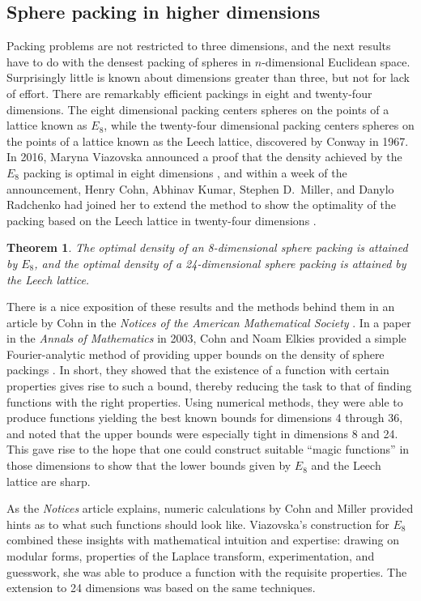 \documentclass{amsart}
\newtheorem{theorem}{Theorem}[section]
\theoremstyle{definition}
\theoremstyle{remark}
\numberwithin{equation}{section}
\begin{document}
\subsection{Sphere packing in higher dimensions}

Packing problems are not restricted to three dimensions, and the next results have to do with the densest packing of spheres in $n$-dimensional Euclidean space. Surprisingly little is known about dimensions greater than three, but not for lack of effort. There are remarkably efficient packings in eight and twenty-four dimensions. The eight dimensional packing centers spheres on the points of a lattice known as $E_8$, while the twenty-four dimensional packing centers spheres on the points of a lattice known as the Leech lattice, discovered by Conway in 1967. In 2016, Maryna Viazovska announced a proof that the density achieved by the $E_8$ packing is optimal in eight dimensions \cite{viazovska:17}, and within a week of the announcement, Henry Cohn, Abhinav Kumar, Stephen D.~Miller, and Danylo Radchenko had joined her to extend the method to show the optimality of the packing based on the Leech lattice in twenty-four dimensions \cite{cohn:et:al:17}.

\begin{theorem}
\label{theorem:leech}
The optimal density of an 8-dimensional sphere packing is attained by $E_8$, and the optimal density of a 24-dimensional sphere packing is attained by the Leech lattice.
\end{theorem}

There is a nice exposition of these results and the methods behind them in an article by Cohn in the \emph{Notices of the American Mathematical Society} \cite{cohn:17}. In a paper in the \emph{Annals of Mathematics} in 2003, Cohn and Noam Elkies provided a simple Fourier-analytic method of providing upper bounds on the density of sphere packings \cite{cohn:17}. In short, they showed that the existence of a function with certain properties gives rise to such a bound, thereby reducing the task to that of finding functions with the right properties. Using numerical methods, they were able to produce functions yielding the best known bounds for dimensions 4 through 36, and noted that the upper bounds were especially tight in dimensions 8 and 24. This gave rise to the hope that one could construct suitable ``magic functions'' in those dimensions to show that the lower bounds given by $E_8$ and the Leech lattice are sharp.

As the \emph{Notices} article explains, numeric calculations by Cohn and Miller provided hints as to what such functions should look like. Viazovska's construction for $E_8$ combined these insights with mathematical intuition and expertise: drawing on modular forms, properties of the Laplace transform, experimentation, and guesswork, she was able to produce a function with the requisite properties. The extension to 24 dimensions was based on the same techniques.
\end{document}
